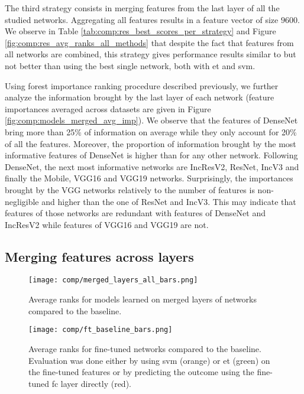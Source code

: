 The third strategy consists in merging features from the last layer of all the studied networks. Aggregating all features results in a feature vector of size $9600$. We observe in Table \ref{tab:comp:res_best_scores_per_strategy} and Figure \ref{fig:comp:res_avg_ranks_all_methods} that despite the fact that features from all networks are combined, this strategy gives performance results similar to but not better than using the best single network, both with \acrshort{et} and \acrshort{svm}.

Using forest importance ranking procedure described previously, we further analyze the information brought by the last layer of each network (feature importances averaged across datasets are given in Figure \ref{fig:comp:models_merged_avg_imp}). We observe that the features of DenseNet bring more than 25\% of information on average while they only account for 20\% of all the features. Moreover, the proportion of information brought by the most informative features of DenseNet is higher than for any other network. Following DenseNet, the next most informative networks are IncResV2, ResNet, IncV3 and finally the Mobile, VGG16 and VGG19 networks. 
Surprisingly, the importances brought by the VGG networks relatively to the number of features is non-negligible and higher than the one of ResNet and IncV3. This may indicate that features of those networks are redundant with features of DenseNet and IncResV2 while features of VGG16 and VGG19 are not.


\subsection{Merging features across layers}
\label{ssec:comp:exp_merged_layers}

\begin{figure}
    \centering
    \texttt{[image: comp/merged\_layers\_all\_bars.png]}
    \caption{Average ranks for models learned on merged layers of networks compared to the baseline.}
    \label{fig:comp:res_avg_ranks_merged_layers}
\end{figure}

 
\begin{figure}
    \centering
    \texttt{[image: comp/ft\_baseline\_bars.png]}
    \caption{Average ranks for fine-tuned networks compared to the baseline. Evaluation was done either by using \acrshort{svm} (orange) or \acrlong{et} (green) on the fine-tuned features or by predicting the outcome using the fine-tuned \acrlong{fc} layer directly (red).}
    \label{fig:comp:res_avg_ranks_ft}
\end{figure}

